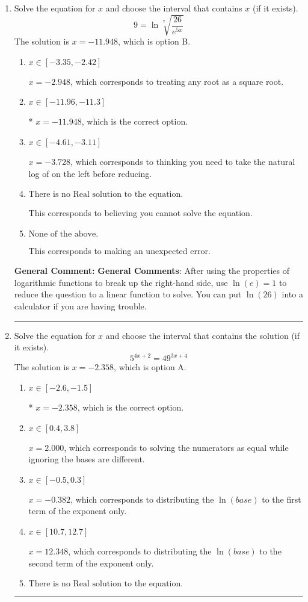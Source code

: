 \documentclass{extbook}[14pt]
\newcommand{\litem}[1]{\item #1

\rule{\textwidth}{0.4pt}}
\begin{document}
\begin{enumerate}\litem{
 Solve the equation for $x$ and choose the interval that contains $x$ (if it exists).
\[  9 = \ln{\sqrt[7]{\frac{26}{e^{5x}}}} \]The solution is \( x = -11.948 \), which is option B.\begin{enumerate}[label=\Alph*.]
\item \( x \in [-3.35, -2.42] \)

$x = -2.948$, which corresponds to treating any root as a square root.
\item \( x \in [-11.96, -11.3] \)

* $x = -11.948$, which is the correct option.
\item \( x \in [-4.61, -3.11] \)

$x = -3.728$, which corresponds to thinking you need to take the natural log of on the left before reducing.
\item \( \text{There is no Real solution to the equation.} \)

This corresponds to believing you cannot solve the equation.
\item \( \text{None of the above.} \)

This corresponds to making an unexpected error.
\end{enumerate}

\textbf{General Comment:} \textbf{General Comments}: After using the properties of logarithmic functions to break up the right-hand side, use $\ln(e) = 1$ to reduce the question to a linear function to solve. You can put $\ln(26)$ into a calculator if you are having trouble.
}
\litem{
Solve the equation for $x$ and choose the interval that contains the solution (if it exists).
\[ 5^{4x+2} = 49^{3x+4} \]The solution is \( x = -2.358 \), which is option A.\begin{enumerate}[label=\Alph*.]
\item \( x \in [-2.6, -1.5] \)

* $x = -2.358$, which is the correct option.
\item \( x \in [0.4, 3.8] \)

$x = 2.000$, which corresponds to solving the numerators as equal while ignoring the bases are different.
\item \( x \in [-0.5, 0.3] \)

$x = -0.382$, which corresponds to distributing the $\ln(base)$ to the first term of the exponent only.
\item \( x \in [10.7, 12.7] \)

$x = 12.348$, which corresponds to distributing the $\ln(base)$ to the second term of the exponent only.
\item \( \text{There is no Real solution to the equation.} \)


\end{enumerate}}
\end{enumerate}
\end{document}

